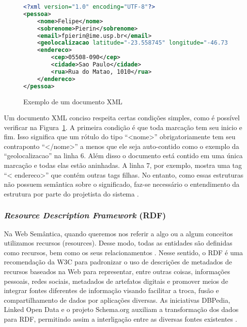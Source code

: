 \begin{figure}[!ht]
    \begin{lstlisting}[language=XML]
<?xml version="1.0" encoding="UTF-8"?>
<pessoa>
	<nome>Felipe</nome>
	<sobrenome>Pierin</sobrenome>
	<email>fpierin@ime.usp.br</email>
	<geolocalizacao latitude="-23.558745" longitude="-46.731859" />
	<endereco>
		<cep>05508-090</cep>
		<cidade>Sao Paulo</cidade>
	    <rua>Rua do Matao, 1010</rua>
	</endereco>
</pessoa>	
    \end{lstlisting}
    \caption{Exemplo de um documento XML}
    \label{fig:exemplo_codigo_xml} 
\end{figure}

Um documento XML conciso respeita certas condições simples, como é possível verificar na Figura~\ref{fig:exemplo_codigo_xml}. A primeira condição é que toda marcação tem seu inicio e fim. Isso significa que um rótulo do tipo ``<nome>'' obrigatoriamente tem seu contraponto ``</nome>'' a menos que ele seja auto-contido como o exemplo da ``geolocalizacao'' na linha 6. Além disso o documento está contido em uma única marcação e todas elas estão aninhadas. A linha 7, por exemplo, mostra uma tag ``< endereco>'' que contém outras tags filhas. No entanto, como essas estruturas não possuem semântica sobre o significado, faz-se necessário o entendimento da estrutura por parte do projetista do sistema \citep{Allemang2011}.

\subsubsection{\emph{Resource Description Framework} (RDF)}
\label{sec:rdf}

Na Web Semântica, quando queremos nos referir a algo ou a algum conceitos utilizamos recursos (resources). Desse modo, todas as entidades são definidas como recursos, bem como os seus relacionamentos \citep {Allemang2011}. Nesse sentido, o RDF é uma recomendação da W3C para padronizar o uso de descrições de metadados de recursos baseados na Web \citep{VanDeursen2008} para representar, entre outras coisas, informações pessoais, redes sociais, metadados de artefatos digitais e promover meios de integrar fontes diferentes de informação visando facilitar a troca, fusão e compartilhamento de dados por aplicações diversas. As iniciativas DBPedia, Linked Open Data e o projeto Schema.org auxiliam a transformação dos dados para RDF,  permitindo assim a interligação entre as diversas fontes existentes \citep{Heath2008}.

